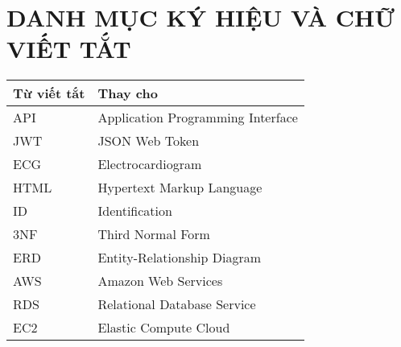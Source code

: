
\tableofcontents %
\thispagestyle{empty}
\cleardoublepage

\section*{DANH MỤC KÝ HIỆU VÀ CHỮ VIẾT TẮT}%



\begin{table}[H]
  \centering
  \begin{tabularx}{0.85\textwidth}{
  | >{\centering\arraybackslash}m{3cm}
  | >{\centering\arraybackslash}X|
  }
  \hline
  \bfseries Từ viết tắt     &\bfseries Thay cho\hspace{1cm}\\ \hline
  API     & Application Programming Interface \\ \hline
  JWT  & JSON Web Token \\ \hline
  ECG   & Electrocardiogram \\ \hline
  HTML   & Hypertext Markup Language \\ \hline
  ID    & Identification \\ \hline
  3NF   & Third Normal Form \\ \hline
  ERD     & Entity-Relationship Diagram \\ \hline
  AWS  & Amazon Web Services \\ \hline
  RDS   & Relational Database Service \\ \hline
  EC2   & Elastic Compute Cloud \\ \hline
  
  \end{tabularx}
  \label{bang31}
\end{table}


\cleardoublepage

{
\let\oldnumberline\numberline
\renewcommand{\numberline}{\figurename~\oldnumberline}%
\listoffigures
} %
\cleardoublepage

{
\let\oldnumberline\numberline
\renewcommand{\numberline}{\tablename~\oldnumberline}%
\listoftables
} %
\cleardoublepage
